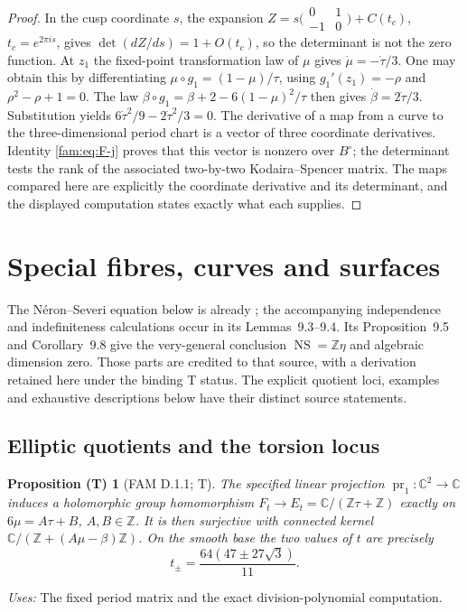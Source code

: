 \documentclass[11pt,a4paper]{article}
\theoremstyle{plain}
\newtheorem{proposition}[theorem]{Proposition (T)}
\theoremstyle{definition}
\begin{document}
\begin{proof}
In the cusp coordinate $s$, the expansion
$Z=s\bigl(\begin{smallmatrix}0&1\\-1&0\end{smallmatrix}\bigr)+C(t_c)$,
$t_c=e^{2\pi is}$, gives
$\det(dZ/ds)=1+O(t_c)$, so the determinant is not the zero function.
At $z_1$ the fixed-point transformation law of $\mu$ gives
$\dot\mu=-\dot\tau/3$.  One may obtain this by differentiating
$\mu\circ g_1=(1-\mu)/\tau$, using
$g_1'(z_1)=-\rho$ and $\rho^2-\rho+1=0$.
The law
$\beta\circ g_1=\beta+2-6(1-\mu)^2/\tau$ then gives
$\dot\beta=2\dot\tau/3$.  Substitution yields
$6\dot\tau^2/9-2\dot\tau^2/3=0$.
The derivative of a map from a curve to the three-dimensional period
chart is a vector of three coordinate derivatives.  Identity
\eqref{fam:eq:F-j} proves that this vector is nonzero over $B^\circ$;
the determinant tests the rank of the associated two-by-two
Kodaira--Spencer matrix.  The maps compared here are explicitly the
coordinate derivative and its determinant, and the displayed computation
states exactly what each supplies.
\end{proof}

\section{Special fibres, curves and surfaces}
\label{sec:fibres}
The N\'eron--Severi equation below is already
\cite[\S9.1, Lemma~9.2]{AC26}; the accompanying independence and
indefiniteness calculations occur in its Lemmas~9.3--9.4. Its
Proposition~9.5 and Corollary~9.8 give the very-general conclusion
$\operatorname{NS}=\mathbb Z\eta$ and algebraic dimension zero.
Those parts are credited to that source, with a derivation retained here
under the binding T status. The explicit quotient loci, examples and
exhaustive descriptions below have their distinct source statements.
\subsection{Elliptic quotients and the torsion locus}
\begin{proposition}[FAM D.1.1; T]\label{fam:D.1.1}
The specified linear projection \(\operatorname{pr}_1:\mathbb C^2\to
\mathbb C\) induces a holomorphic group homomorphism
\(F_t\to E_t=\mathbb C/(\mathbb Z\tau+\mathbb Z)\) exactly on
\(6\mu=A\tau+B\), \(A,B\in\mathbb Z\). It is then surjective with
connected kernel
\(\mathbb C/(\mathbb Z+(A\mu-\beta)\mathbb Z)\).
On the smooth base the two values of \(t\) are precisely
\[
 t_\pm=\frac{64(47\pm27\sqrt3)}{11}.
\]
\end{proposition}
\noindent\emph{Uses:} The fixed period matrix and the exact division-polynomial computation.\par
\end{document}
